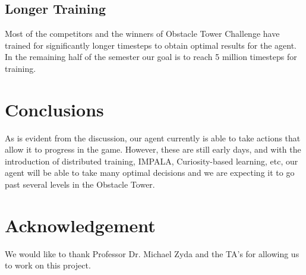 \documentclass[conference]{IEEEtran}
\begin{document}
\subsection{\textbf{Longer Training}}
Most of the competitors and the winners of Obstacle Tower Challenge have trained for significantly longer timesteps to obtain optimal results for the agent. In the remaining half of the semester our goal is to reach 5 million timesteps for training.

\section{Conclusions}

As is evident from the discussion, our agent currently is able to take actions that allow it to progress in the game. However, these are still early days, and with the introduction of distributed training, IMPALA, Curiosity-based learning, etc, our agent will be able to take many optimal decisions and we are expecting it to go past several levels in the Obstacle Tower.

\section{Acknowledgement}

We would like to thank Professor Dr. Michael Zyda and the TA's for allowing us to work on this project.
\end{document}
